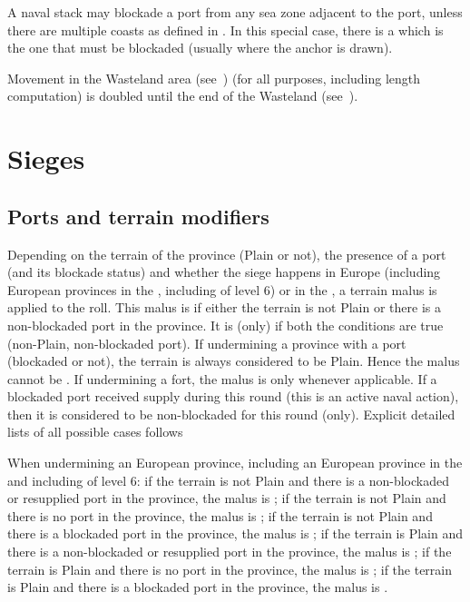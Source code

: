 \label{chMilitary:Movement:Blockading
  Multiple Coasts} A naval stack may blockade a port from any sea zone
adjacent to the port, unless there are multiple coasts as defined in
.
\bparag In this special case, there is a  which is the
one that must be blockaded (usually where the anchor is drawn).

\aparag[Wasteland]\label{chMilitary:Movement:Wasteland} Movement in the
Wasteland area (see~) (for all purposes,
including \LoS length computation) is doubled until the end of the
Wasteland (see~).

\section{Sieges}
\subsection{Ports and terrain modifiers}
\label{chMilitary:Concepts:Siege:Terrain}
 Depending on the terrain of the province (Plain or
not), the presence of a port (and its blockade status) and whether the siege
happens in Europe (including European provinces in the \ROTW, including \COL
of level 6) or in the \ROTW, a terrain malus is applied to the roll.
\bparag This malus is  if either the terrain is not Plain or there
is a non-blockaded port in the province.
\bparag It is  (only) if both the conditions are true (non-Plain,
non-blockaded port).
\bparag If undermining a \ROTW province with a port (blockaded or not), the
terrain is always considered to be Plain. Hence the malus cannot be
.
\bparag If undermining a fort, the malus is only  whenever
applicable.
\bparag If a blockaded port received supply during this round (this is an
active naval action), then it is considered to be non-blockaded for this round
(only).
\bparag Explicit detailed lists of all possible cases follows

 When undermining an European province,
including an European province in the \ROTW and including \COL of level 6:
\bparag if the terrain is not Plain and there is a non-blockaded or resupplied
port in the province, the malus is ;
\bparag if the terrain is not Plain and there is no port in the province, the
malus is ;
\bparag if the terrain is not Plain and there is a blockaded port in the
province, the malus is ;
\bparag if the terrain is Plain and there is a non-blockaded or resupplied
port in the province, the malus is ;
\bparag if the terrain is Plain and there is no port in the province, the
malus is ;
\bparag if the terrain is Plain and there is a blockaded port in the
province, the malus is .

